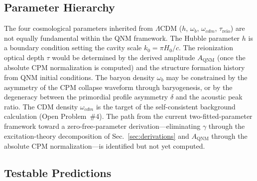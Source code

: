 \documentclass[aps,prd,twocolumn,superscriptaddress,showpacs,preprintnumbers,amsmath,amssymb,nofootinbib]{revtex4-2}
\newcommand{\lcdm}{$\Lambda$CDM}
\begin{document}
\subsection{Parameter Hierarchy}
\label{sec:hierarchy}

The four cosmological parameters inherited from \lcdm{} ($h$, $\omega_b$, $\omega_{cdm}$, $\tau_\mathrm{reio}$) are not equally fundamental within the QNM framework. The Hubble parameter $h$ is a boundary condition setting the cavity scale $k_0 = \pi H_0/c$. The reionization optical depth $\tau$ would be determined by the derived amplitude $A_\mathrm{QNM}$ (once the absolute CPM normalization is computed) and the structure formation history from QNM initial conditions. The baryon density $\omega_b$ may be constrained by the asymmetry of the CPM collapse waveform through baryogenesis, or by the degeneracy between the primordial profile asymmetry $\delta$ and the acoustic peak ratio. The CDM density $\omega_{cdm}$ is the target of the self-consistent background calculation (Open Problem~\#4). The path from the current two-fitted-parameter framework toward a zero-free-parameter derivation---eliminating $\gamma$ through the excitation-theory decomposition of Sec.~\ref{sec:derivations} and $A_\mathrm{QNM}$ through the absolute CPM normalization---is identified but not yet computed.


\subsection{Testable Predictions}
\label{sec:predictions}
\end{document}
